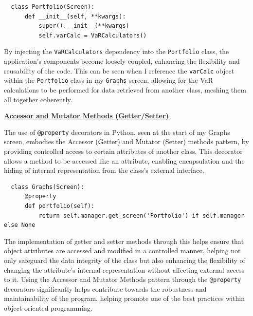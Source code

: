 \documentclass{article}
\begin{document}
\begin{verbatim}
  class Portfolio(Screen):
      def __init__(self, **kwargs):
          super().__init__(**kwargs)
          self.varCalc = VaRCalculators() 
\end{verbatim}

\vspace{0.3cm}
By injecting the \texttt{VaRCalculators} dependency into the \texttt{Portfolio} class, the application's components become loosely coupled, enhancing the flexibility and reusability of the code. This can be seen when I reference the \texttt{varCalc} object within the \texttt{Portfolio} class in my \texttt{Graphs} screen, allowing for the VaR calculations to be performed for data retrieved from another class, meshing them all together coherently.\\\vspace{0.3cm}

\vspace{0.3cm}
\underline{\textbf{Accessor and Mutator Methods (Getter/Setter)}}\\\vspace{0.3cm}

The use of \texttt{@property} decorators in Python, seen at the start of my Graphs screen, embodies the Accessor (Getter) and Mutator (Setter) methods pattern, by providing controlled access to certain attributes of another class. This decorator allows a method to be accessed like an attribute, enabling encapsulation and the hiding of internal representation from the class's external interface.\\\vspace{0.3cm}

\begin{verbatim}
  class Graphs(Screen):
      @property
      def portfolio(self):
          return self.manager.get_screen('Portfolio') if self.manager else None
\end{verbatim}

\vspace{0.3cm}
The implementation of getter and setter methods through this helps ensure that object attributes are accessed and modified in a controlled manner, helping not only safeguard the data integrity of the class but also enhancing the flexibility of changing the attribute's internal representation without affecting external access to it. Using the Accessor and Mutator Methods pattern through the \texttt{@property} decorators significantly helps contribute towards the robustness and maintainability of the program, helping promote one of the best practices within object-oriented programming.\\\vspace{0.3cm}
\end{document}

